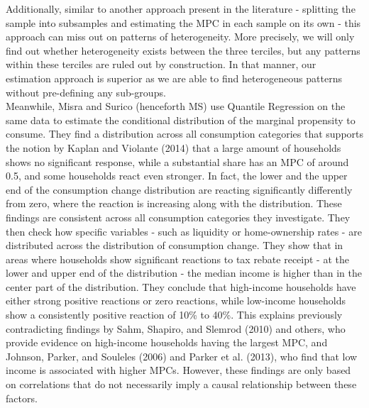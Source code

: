 Additionally, similar to another approach present in the literature - splitting the sample into subsamples and estimating the MPC in each sample on its own - this approach can miss out on patterns of heterogeneity. More precisely, we will only find out whether heterogeneity exists between the three terciles, but any patterns within these terciles are ruled out by construction. In that manner, our estimation approach is superior as we are able to find heterogeneous patterns without pre-defining any sub-groups. \\
Meanwhile, Misra and Surico (henceforth MS) use Quantile Regression on the same data to estimate the conditional distribution of the marginal propensity to consume. They find a distribution across all consumption categories that supports the notion by Kaplan and Violante (2014) that a large amount of households shows no significant response, while a substantial share has an MPC of around 0.5, and some households react even stronger. In fact, the lower and the upper end of the consumption change distribution are reacting significantly differently from zero, where the reaction is increasing along with the distribution. These findings are consistent across all consumption categories they investigate. They then check how specific variables - such as liquidity or home-ownership rates - are distributed across the distribution of consumption change. They show that in areas where households show significant reactions to tax rebate receipt - at the lower and upper end of the distribution - the median income is higher than in the center part of the distribution. They conclude that high-income households have either strong positive reactions or zero reactions, while low-income households show a consistently positive reaction of 10\% to 40\%. This explains previously contradicting findings by Sahm, Shapiro, and Slemrod (2010) and others, who provide evidence on high-income households having the largest MPC, and Johnson, Parker, and Souleles (2006) and Parker et al. (2013), who find that low income is associated with higher MPCs. However, these findings are only based on correlations that do not necessarily imply a causal relationship between these factors. \\ 
